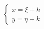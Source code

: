 \documentclass[preview]{standalone}
\begin{document}
\begin{align*}
\left\{\begin{array}{l}x=\xi+h\\y=\eta+k\end{array}\right.
\end{align*}
\end{document}
